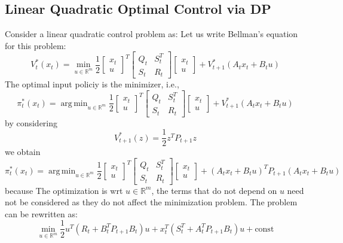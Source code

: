 \documentclass{book}
\DeclareMathOperator*{\argmin}{arg\,min}
\newcommand{\R}{\mathbb{R}}
\theoremstyle{definition}
\theoremstyle{remark}
\theoremstyle{remark}
\begin{document}
\subsection{Linear Quadratic Optimal Control via DP}
Consider a linear quadratic control problem as: 
Let us write Bellman's equation for this problem: 
\[
    V_t^*(x_t) = \min_{u\in\R^m}\displaystyle\frac{1}{2}\begin{bmatrix}
        x_t \\ u 
    \end{bmatrix}^T \begin{bmatrix}
    Q_t & S_t^T \\ S_t & R_t
    \end{bmatrix} \begin{bmatrix}
        x_t \\ u
\end{bmatrix} + V_{t+1}^*(A_tx_t+B_tu)
\]
The optimal input policiy is the minimizer, i.e., 
\[
    \pi_t^*(x_t)=\argmin_{u\in\R^m}\displaystyle\frac{1}{2}\begin{bmatrix}
        x_t \\ u 
    \end{bmatrix}^T \begin{bmatrix}
    Q_t & S_t^T \\ S_t & R_t
    \end{bmatrix} \begin{bmatrix}
        x_t \\ u
\end{bmatrix} + V_{t+1}^*(A_tx_t+B_tu)
\]
by considering 
\[
    V_{t+1}^*(z)=\displaystyle\frac{1}{2}z^TP_{t+1}z
\]
we obtain 
\[
    \pi_t^*(x_t)=\argmin_{u\in\R^m}\displaystyle\frac{1}{2}\begin{bmatrix}
        x_t \\ u 
    \end{bmatrix}^T \begin{bmatrix}
    Q_t & S_t^T \\ S_t & R_t
    \end{bmatrix} \begin{bmatrix}
        x_t \\ u
\end{bmatrix} + (A_tx_t+B_tu)^TP_{t+1}(A_tx_t+B_tu)
\]
because The optimization is wrt $u\in\R^m$, the terms that do not depend on $u$ need not be considered as they do not affect the minimization problem. The problem can be rewritten as: 
\[
    \min_{u\in\R^m}\displaystyle\frac{1}{2}u^T(R_t+B_t^TP_{t+1}B_t)u+x_t^T(S_t^T+A_t^TP_{t+1}B_t)u + \text{const}
\]
\end{document}
